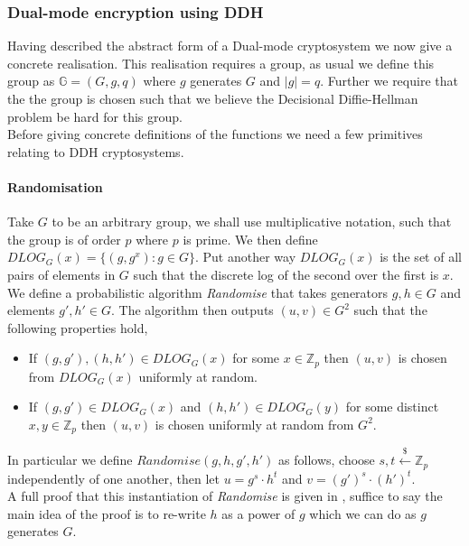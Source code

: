 \documentclass[ %
                    author={Nicholas Tutte},
                supervisor={Prof. Nigel Smart},
                    degree={MEng},
                     title={Secure Two Party Computation},
                  subtitle={A practical comparison of recent protocols},
                      type={Research - GG1K},
                      year={2015} ]{dissertation}
\begin{document}
				\subsubsection{Dual-mode encryption using DDH}

					Having described the abstract form of a Dual-mode cryptosystem we now give a concrete realisation. This realisation requires a group, as usual we define this group as $\mathbb{G} = (G, g, q)$ where $g$ generates $G$ and $|g| = q$. Further we require that the the group is chosen such that we believe the Decisional Diffie-Hellman problem be hard for this group.\\

					Before giving concrete definitions of the functions we need a few primitives relating to DDH cryptosystems.
					
					\paragraph{Randomisation} Take $G$ to be an arbitrary group, we shall use multiplicative notation, such that the group is of order $p$ where $p$ is prime. We then define $DLOG_G(x) = \{ (g, g^x) : g \in G\}$. Put another way $DLOG_G(x)$ is the set of all pairs of elements in $G$ such that the discrete log of the second over the first is $x$.\\
					
					We define a probabilistic algorithm \emph{Randomise} that takes generators $g,h \in G$ and elements $g', h' \in G$. The algorithm then outputs $(u, v) \in G^2$ such that the following properties hold,
					
					\begin{itemize}
						\item If $(g, g'), (h, h') \in DLOG_G(x)$ for some $x \in \mathbb{Z}_p$ then $(u, v)$ is chosen from $DLOG_G(x)$ uniformly at random.

						\item If $(g, g')\in DLOG_G(x)$ and $(h, h') \in DLOG_G(y)$ for some distinct $x, y \in \mathbb{Z}_p$ then $(u, v)$ is chosen uniformly at random from $G^2$.
					\end{itemize}

					In particular we define $Randomise(g, h, g', h')$ as follows, choose $s, t \xleftarrow{\$} \mathbb{Z}_p$ independently of one another, then let $u = g^s \cdot h^t$ and $v = (g')^s \cdot (h')^t$.\\

					A full proof that this instantiation of \emph{Randomise} is given in \cite{PVW_OT_2008}, suffice to say the main idea of the proof is to re-write $h$ as a power of $g$ which we can do as $g$ generates $G$.\\
\end{document}
